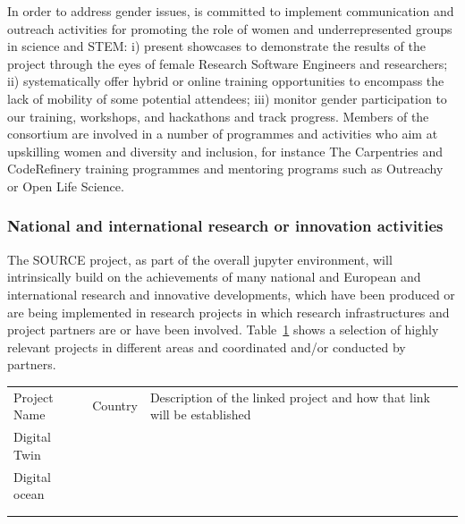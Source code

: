 In order to address gender issues, \TheProject is committed to implement
communication and outreach activities for promoting the role of women and underrepresented groups in science
and STEM: i) present showcases to demonstrate the results of the project through
the eyes of female Research Software Engineers and researchers; ii)
systematically offer hybrid or online training opportunities to encompass the
lack of mobility of some potential attendees; iii) monitor gender participation
to our training, workshops, and hackathons and track progress. Members of the
consortium are involved in a number of programmes and activities who aim at
upskilling women and diversity and inclusion, for instance The Carpentries and
CodeRefinery training programmes and mentoring programs such as Outreachy or
Open Life Science.

\subsubsection{National and international research or innovation activities}

\TOWRITE{}{}

The SOURCE project, as part of the overall jupyter environment, will intrinsically build on the achievements of many national and European and international research and innovative developments, which have been produced or are being implemented in research projects in which research infrastructures and project partners are or have been involved.
Table~\ref{tab:national-research} shows a selection of highly relevant projects in different areas and coordinated and/or conducted by \TheProject partners.



\begin{table}[]
\label{tab:national-research}
\begin{tabular}{lll}
\rowcolor[HTML]{00D2CB}

Project Name  & Country & Description of the linked project and how that link will be established \\
Digital Twin  &         &                                                                         \\
Digital ocean &         &                                                                         \\
              &         &                                                                         \\
              &         &

\end{tabular}
\end{table}




